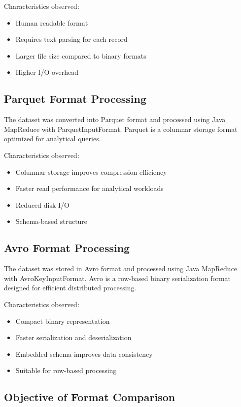 \documentclass[12pt,a4paper]{report}
\begin{document}
Characteristics observed:
\begin{itemize}
\item Human readable format
\item Requires text parsing for each record
\item Larger file size compared to binary formats
\item Higher I/O overhead
\end{itemize}

\subsection{Parquet Format Processing}

The dataset was converted into Parquet format and processed using Java MapReduce
with ParquetInputFormat. Parquet is a columnar storage format optimized for
analytical queries.

Characteristics observed:
\begin{itemize}
\item Columnar storage improves compression efficiency
\item Faster read performance for analytical workloads
\item Reduced disk I/O
\item Schema-based structure
\end{itemize}

\subsection{Avro Format Processing}

The dataset was stored in Avro format and processed using Java MapReduce with
AvroKeyInputFormat. Avro is a row-based binary serialization format designed for
efficient distributed processing.

Characteristics observed:
\begin{itemize}
\item Compact binary representation
\item Faster serialization and deserialization
\item Embedded schema improves data consistency
\item Suitable for row-based processing
\end{itemize}

\subsection{Objective of Format Comparison}
\end{document}
